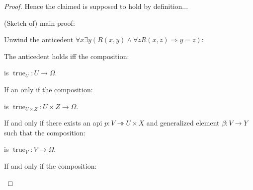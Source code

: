 \documentclass[a4paper]{article}
\DeclareMathOperator{\ev}{\text {ev}}
\DeclareMathOperator{\true}{\text {true}}
\begin{document}
\begin{proof}
    Hence the claimed is supposed to hold by definition...

    (Sketch of) main proof:

    Unwind the anticedent $\forall x\exists y (R(x,y)\land \forall z R(x,z)\Rightarrow y = z)$:

    The anticedent holds iff the composition:

    \begin{center}
    \end{center}

    is $\true_U:U\to \Omega$.

    If an only if the composition:

    \begin{center}
    \end{center}

    is $\true_{U\times Z}:U\times Z\to \Omega$.

    If and only if there exists an api $p:V\twoheadrightarrow U\times X$ and generalized element $\beta:V\to Y$ such that the composition:
    \begin{center}
    \end{center}

    is $\true_V:V\to\Omega$.

    If and only if the composition:

    \begin{center}
    \end{center}


\end{proof}
\end{document}
